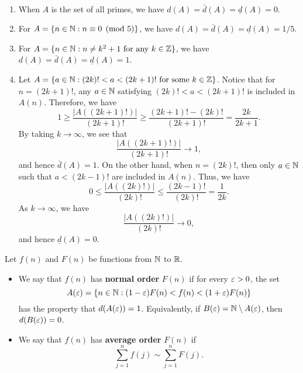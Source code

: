 \begin{exmp}\label{exmp:4.6}~
    \begin{enumerate}[(1)]
        \item When $A$ is the set of all primes, we have 
        $d(A) = \bar{d}(A) = \underline{d}(A) = 0$. 
        \item For $A = \{n \in \mathbb{N} : n \equiv 0 \pmod 5\}$, we have 
        $d(A) = \bar{d}(A) = \underline{d}(A) = 1/5$.
        \item For $A = \{n \in \mathbb{N} : n \neq k^2 + 1 \text{ for any } k \in \mathbb{Z}\}$, 
        we have $d(A) = \bar{d}(A) = \underline{d}(A) = 1$.
        \item Let $A = \{a \in \mathbb{N} : (2k)! < a < (2k+1)! \text{ for some } k \in \mathbb{Z}\}$. 
        Notice that for $n = (2k+1)!$, any $a \in \mathbb{N}$ satisfying $(2k)! < a < 
        (2k+1)!$ is included in $A(n)$. Therefore, we have 
        \[ 1 \geq \frac{|A((2k+1)!)|}{(2k+1)!} \geq \frac{(2k+1)! - (2k)!}{(2k+1)!} 
        = \frac{2k}{2k+1}. \] 
        By taking $k \to \infty$, we see that 
        \[ \frac{|A((2k+1)!)|}{(2k+1)!} \to 1, \] 
        and hence $\bar{d}(A) = 1$. On the other hand, when $n = (2k)!$, then only 
        $a \in \mathbb{N}$ such that $a < (2k-1)!$ are included in $A(n)$. Thus, we have 
        \[ 0 \leq \frac{|A((2k)!)|}{(2k)!} \leq \frac{(2k-1)!}{(2k)!} = \frac{1}{2k}. \] 
        As $k \to \infty$, we have 
        \[ \frac{|A((2k)!)|}{(2k)!} \to 0, \] 
        and hence $\underline{d}(A) = 0$.
    \end{enumerate} 
\end{exmp}

\begin{defn}\label{def:4.7}
    Let $f(n)$ and $F(n)$ be functions from $\mathbb{N}$ to $\mathbb{R}$. 
    \begin{itemize}
        \item We say that $f(n)$ has {\bf normal order} $F(n)$ if for every 
        $\varepsilon > 0$, the set 
        \[ A(\varepsilon) = \{n \in \mathbb{N} : (1-\varepsilon)F(n) < f(n) < (1+\varepsilon)F(n)\} \] 
        has the property that $d(A(\varepsilon)) = 1$. Equivalently, if $B(\varepsilon) 
        = \mathbb{N} \setminus A(\varepsilon)$, then $d(B(\varepsilon)) = 0$. 
        \item We say that $f(n)$ has {\bf average order} $F(n)$ if 
        \[ \sum_{j=1}^n f(j) \sim \sum_{j=1}^n F(j). \] 
    \end{itemize}
\end{defn}

